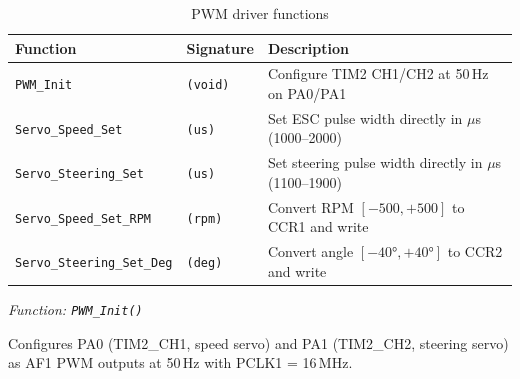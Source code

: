 \documentclass[12pt,a4paper]{article}
\begin{document}
\begin{table}[H]
\centering
\begin{tabular}{lll}
\hline
\textbf{Function} & \textbf{Signature} & \textbf{Description} \\
\hline
\texttt{PWM\_Init}              & \texttt{(void)}    & Configure TIM2 CH1/CH2 at 50\,Hz on PA0/PA1 \\
\texttt{Servo\_Speed\_Set}      & \texttt{(us)}      & Set ESC pulse width directly in \(\mu\)s (1000--2000) \\
\texttt{Servo\_Steering\_Set}   & \texttt{(us)}      & Set steering pulse width directly in \(\mu\)s (1100--1900) \\
\texttt{Servo\_Speed\_Set\_RPM} & \texttt{(rpm)}     & Convert RPM \([-500,+500]\) to CCR1 and write \\
\texttt{Servo\_Steering\_Set\_Deg} & \texttt{(deg)}  & Convert angle \([-40°,+40°]\) to CCR2 and write \\
\hline
\end{tabular}
\caption{PWM driver functions}
\end{table}

\textit{Function: \texttt{PWM\_Init()}}

Configures PA0 (TIM2\_CH1, speed servo) and PA1 (TIM2\_CH2, steering servo) as AF1 PWM outputs at 50\,Hz with PCLK1 = 16\,MHz.
\end{document}
